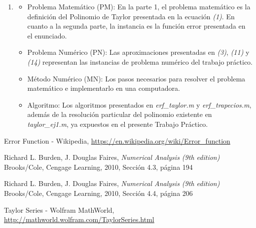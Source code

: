 \documentclass[titlepage,a4paper]{article}
\begin{document}
\begin{enumerate}[label=(\alph*)]
		\item
			\begin{itemize}
				\item Problema Matemático (PM): En la parte 1, el problema matemático es la definición del Polinomio de Taylor presentada en la ecuación \emph{(1)}. En cuanto a la segunda parte, la instancia es la función error presentada en el enunciado.
				\item Problema Numérico (PN): Las aproximaciones presentadas en \emph{(3)}, \emph{(11)} y \emph{(14)} representan las instancias de problema numérico del trabajo práctico.
				\item Método Numérico (MN): Los pasos necesarios para resolver el problema matemático e implementarlo en una computadora.
				\item Algoritmo: Los algoritmos presentados en \textit{erf\_taylor.m} y \textit{erf\_trapecios.m}, además de la resolución particular del polinomio existente en \textit{taylor\_ej1.m}, ya expuestos en el presente Trabajo Práctico.
			\end{itemize}

	\end{enumerate}

\begin{thebibliography}{9} 
		Error Function - Wikipedia, \url{https://en.wikipedia.org/wiki/Error_function}
	
		Richard L. Burden, J. Douglas Faires, \emph{Numerical Analysis (9th edition)} \\
		Brooks/Cole, Cengage Learning, 2010, Sección 4.3, página 194

	Richard L. Burden, J. Douglas Faires, \emph{Numerical Analysis (9th edition)} \\
	Brooks/Cole, Cengage Learning, 2010, Sección 4.4, página 206
	
	Taylor Series - Wolfram MathWorld, \url{http://mathworld.wolfram.com/TaylorSeries.html}
	 
\end{thebibliography}
\end{document}
